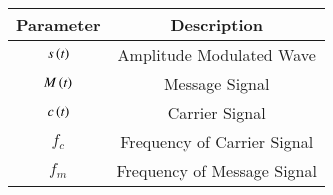 \renewcommand{\arraystretch}{1.5}
\begin{tabular}{|c|c|}
\hline
Parameter & Description  \\\hline
$s\left(t\right)$& Amplitude Modulated Wave \\\hline
$M\left(t\right)$ & Message Signal \\\hline
$c\left(t\right)$ & Carrier Signal \\\hline
$f_c$ & Frequency of Carrier Signal\\\hline
$f_m$& Frequency of Message Signal \\ \hline
\end{tabular}
